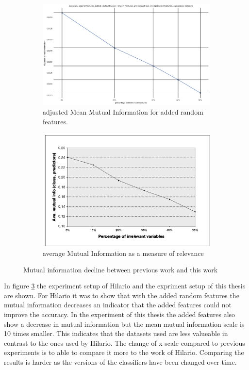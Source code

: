 \documentclass[a4paper,10pt]{article}
\begin{document}
\begin{figure}[H]
	\centering
	\begin{subfigure}[b]{0.45\textwidth}
		\includegraphics[width=\textwidth]{images/MutualInformationDecay.png}
		\caption{adjusted Mean Mutual Information for added random features.}
		\label{fig:AMMIdecay}
	\end{subfigure}
	\begin{subfigure}[b]{0.45\textwidth}
		\includegraphics[width=\textwidth]{images/MutualInformationDecay-paper.png}
		\caption{average Mutual Information as a measure of relevance}
		\label{fig:AMMIpaper}
	\end{subfigure}
	\caption{Mutual information decline between previous work and this work}\label{fig:MMIs}
	\label{paper-thesis}
\end{figure}

In figure \ref{paper-thesis} the experiment setup of Hilario and the expriment setup of this thesis are shown\cite{Resil-1}. For Hilario it was to show that with the added random features the mutual information decreases an indicator that the added features could not improve the accuracy. In the experiment of this thesis the added features also show a decrease in mutual information but the mean mutual information scale is 10 times smaller. This indicates that the datasets used are less valueable in contrast to the ones used by Hilario. The change of x-scale compared to previous experiments is to able to compare it more to the work of Hilario. Comparing the results is harder as the versions of the classifiers have been changed over time.
\end{document}
